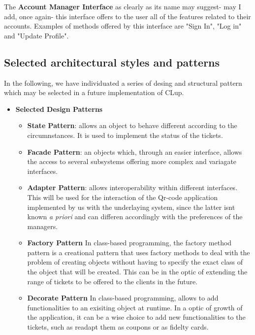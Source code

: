 The \textbf{Account Manager Interface} as clearly as its name may suggest- may I add, once again- this interface offers to the user all of the features related to their accounts. Examples of methods offered by this interface are "Sign In", "Log in" and "Update Profile".

\subsection{Selected architectural styles and patterns}
\label{subsect:selectedarchitecturalstylesandpatterns}

In the following, we have individuated a series of desing and structural pattern which may be selected in a future implementation of CLup.

\begin{itemize}[topsep=0pt]
    \item \textbf{Selected Design Patterns}
        \begin{itemize}[topsep=0pt]
            \item \textbf{State Pattern}: allows an object to behave different according to the circumnstances. It is used to implement the status of the tickets.
            \item \textbf{Facade Pattern}: an objects which, through an easier interface, allows the access to several subsystems offering more complex and variagate interfaces.
            \item \textbf{Adapter Pattern}: allows interoperability within different interfaces. This will be used for the interaction of the Qr-code application implemented by us with the underlaying system, since the latter isnt known \textit{a priori} and can differen accordingly with the preferences of the managers.
            \item \textbf{Factory Pattern} In class-based programming, the factory method pattern is a creational pattern that uses factory methods to deal with the problem of creating objects without having to specify the exact class of the object that will be created. This can be in the optic of extending the range of tickets to be offered to the clients in the future.
            \item \textbf{Decorate Pattern} In class-based programming, allows to add functionalities to an exisiting object at runtime.
            In a optic of growth of the application, it can be a wise choice to add new functionalities to the tickets, such as readapt them as coupons or as fidelty cards.

\end{itemize}
\end{itemize}
